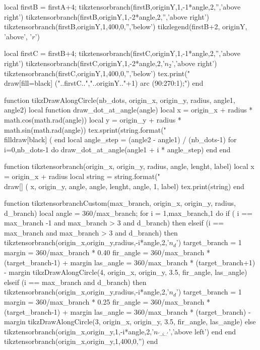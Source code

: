 \begin{luacode*}
          local firstB = firstA+4;
          tikztensorbranch(firstB,originY,1,-1*angle,2,'','above right')
          tikztensorbranch(firstB,originY,1,-2*angle,2,'','above right')
          tikztensorbranch(firstB,originY,1,400,0,'','below')
          tikzlegend(firstB+2, originY, 'above', '$r$')

          local firstC = firstB+4;
          tikztensorbranch(firstC,originY,1,-1*angle,2,'','above right')
          tikztensorbranch(firstC,originY,1,-2*angle,2,'$n_{2}$','above right')
          tikztensorbranch(firstC,originY,1,400,0,'','below')
          tex.print("\\draw[fill=black] ("..firstC..","..originY.."+1) arc (90:270:1);")
    end

function tikzDrawAlongCircle(nb_dots, origin_x, origin_y, radius, angle1, angle2)
    local function draw_dot_at_angle(angle)
      local x = origin_x + radius * math.cos(math.rad(angle))
      local y = origin_y + radius * math.sin(math.rad(angle))
      tex.sprint(string.format("\\filldraw[black] (%
    end
    local angle_step = (angle2 - angle1) / (nb_dots-1)
    for i=0,nb_dots-1 do
      draw_dot_at_angle(angle1 + i * angle_step)
    end
  end
  
    function tikztensorbranch(origin_x, origin_y, radius, angle, lenght, label)
      local x = origin_x + radius
      local string = string.format("\\draw[] (%
      x, origin_y, angle, angle, lenght, angle, 1, label)
      tex.print(string)
    end
  
    function tikztensorbranchCustom(max_branch, origin_x, origin_y, radius, d_branch)
      local angle = 360/max_branch;
      for i = 1,max_branch,1 do
          if ( i == max_branch -1 and max_branch > 3 and d_branch) then
          elseif (i == max_branch and max_branch > 3 and d_branch)  then
            tikztensorbranch(origin_x,origin_y,radius,-i*angle,2,'$n_{d}$')
            target_branch = 1
            margin = 360/max_branch * 0.40
            fir_angle = 360/max_branch * (target_branch-1) + margin
            las_angle = 360/max_branch * (target_branch+1) - margin          
            tikzDrawAlongCircle(4, origin_x, origin_y, 3.5, fir_angle, las_angle)
          elseif (i == max_branch and d_branch)  then
            tikztensorbranch(origin_x,origin_y,radius,-i*angle,2,'$n_{d}$')
            target_branch = 1
            margin = 360/max_branch * 0.25
            fir_angle = 360/max_branch * (target_branch-1) + margin
            las_angle = 360/max_branch * (target_branch) - margin          
            tikzDrawAlongCircle(3, origin_x, origin_y, 3.5, fir_angle, las_angle)
          else
            tikztensorbranch(origin_x,origin_y,1,-i*angle,2,'$n_{'..i..'}$','above left')
          end
        end
        tikztensorbranch(origin_x,origin_y,1,400,0,'')
    end
  

\end{luacode*}
